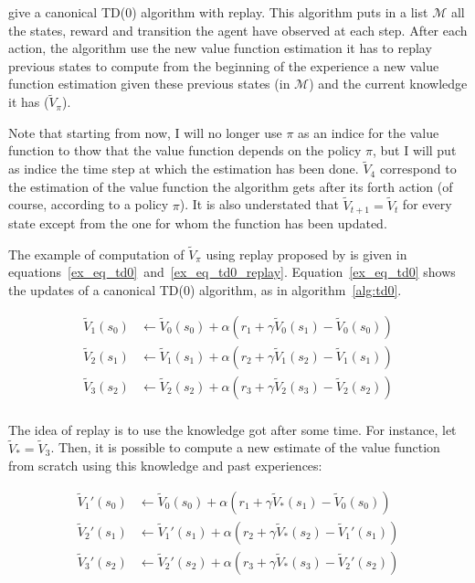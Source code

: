 \documentclass[]{article}
\begin{document}
\textcite{vanseijen_deeper_2015} give a canonical TD(0) algorithm with replay. This algorithm puts in a list \(\mathcal{M}\) all the states, reward and transition the agent have observed at each step. After each action, the algorithm use the new value function estimation it has to replay previous states to compute from the beginning of the experience a new value function estimation given these previous states (in \(\mathcal{M}\)) and the current knowledge it has (\(\tilde{V}_\pi\)).

Note that starting from now, I will no longer use \(\pi\) as an indice for the value function to thow that the value function depends on the policy \(\pi\), but I will put as indice the time step at which the estimation has been done. \(\tilde{V}_4\) correspond to the estimation of the value function the algorithm gets after its forth action (of course, according to a policy \(\pi\)). It is also understated that \(\tilde{V}_{t+1} = \tilde{V}_{t}\) for every state except from the one for whom the function has been updated.

The example of computation of \(\tilde{V}_\pi\) using replay proposed by \textcite{vanseijen_deeper_2015} is given in equations~\ref{ex_eq_td0}~and~\ref{ex_eq_td0_replay}. Equation~\ref{ex_eq_td0} shows the updates of a canonical TD(0) algorithm, as in algorithm~\ref{alg:td0}.

\begin{equation}
  \begin{aligned}
    \tilde{V}_{1}(s_0) &\gets \tilde{V}_0(s_0) + \alpha (r_1 + \gamma \tilde{V}_0(s_1) - \tilde{V}_0(s_0))\\
    \tilde{V}_{2}(s_1) &\gets \tilde{V}_1(s_1) + \alpha (r_2 + \gamma \tilde{V}_1(s_2) - \tilde{V}_1(s_1))\\
    \tilde{V}_{3}(s_2) &\gets \tilde{V}_2(s_2) + \alpha (r_3 + \gamma \tilde{V}_2(s_3) - \tilde{V}_2(s_2))\\
  \end{aligned}
  \label{ex_eq_td0}
\end{equation}

The idea of replay is to use the knowledge got after some time. For instance, let \(\tilde{V}_* = \tilde{V}_3\). Then, it is possible to compute a new estimate of the value function from scratch using this knowledge and past experiences:

\begin{equation}
  \begin{aligned}
    \tilde{V}_{1}'(s_0) &\gets \tilde{V}_0(s_0) + \alpha (r_1 + \gamma \tilde{V}_*(s_1) - \tilde{V}_0(s_0))\\
    \tilde{V}_{2}'(s_1) &\gets \tilde{V}_1'(s_1) + \alpha (r_2 + \gamma \tilde{V}_*(s_2) - \tilde{V}_1'(s_1))\\
    \tilde{V}_3'(s_2) &\gets \tilde{V}_2'(s_2) + \alpha (r_3 + \gamma \tilde{V}_*(s_3) - \tilde{V}_2'(s_2))\\
  \end{aligned}
  \label{ex_eq_td0_replay}
\end{equation}
\end{document}
